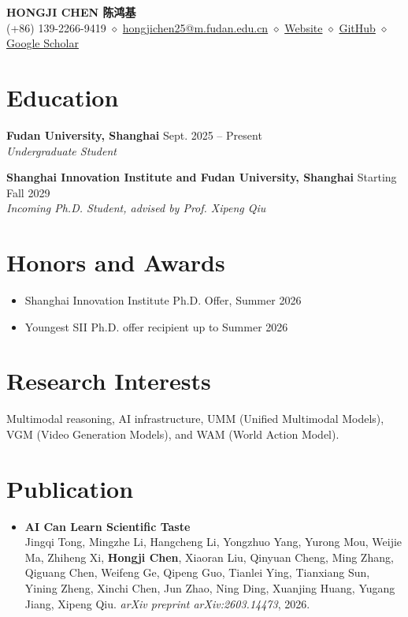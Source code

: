 \documentclass[10pt,letterpaper]{article}
\newcommand{\smallentry}[3]{
  \textbf{#1} \hfill #2\\
  \textit{#3}
}
\begin{document}
\begin{center}
  {\LARGE\bfseries HONGJI CHEN {\large 陈鸿基}}\\[6pt]
  (+86) 139-2266-9419 $\diamond$
  \href{mailto:hongjichen25@m.fudan.edu.cn}{hongjichen25@m.fudan.edu.cn} $\diamond$
  \href{https://realzillionx.github.io/}{Website} $\diamond$
  \href{https://github.com/realZillionX}{GitHub} $\diamond$
  \href{https://scholar.google.com/citations?user=N7Ytb68AAAAJ&hl=en}{Google Scholar}
\end{center}

\section*{Education}
\smallentry{Fudan University, Shanghai}{Sept. 2025 -- Present}
{Undergraduate Student}

\vspace{3pt}
\smallentry{Shanghai Innovation Institute and Fudan University, Shanghai}{Starting Fall 2029}
{Incoming Ph.D. Student, advised by Prof. Xipeng Qiu}

\section*{Honors and Awards}
\begin{itemize}
  \item Shanghai Innovation Institute Ph.D. Offer, Summer 2026
  \item Youngest SII Ph.D. offer recipient up to Summer 2026
\end{itemize}

\section*{Research Interests}
Multimodal reasoning, AI infrastructure, UMM (Unified Multimodal Models), VGM (Video Generation Models), and WAM (World Action Model).

\section*{Publication}
\begin{itemize}
  \item \textbf{AI Can Learn Scientific Taste}\\
  Jingqi Tong, Mingzhe Li, Hangcheng Li, Yongzhuo Yang, Yurong Mou, Weijie Ma, Zhiheng Xi,
  \textbf{Hongji Chen}, Xiaoran Liu, Qinyuan Cheng, Ming Zhang, Qiguang Chen, Weifeng Ge,
  Qipeng Guo, Tianlei Ying, Tianxiang Sun, Yining Zheng, Xinchi Chen, Jun Zhao, Ning Ding,
  Xuanjing Huang, Yugang Jiang, Xipeng Qiu. \textit{arXiv preprint arXiv:2603.14473}, 2026.
\end{itemize}
\end{document}
